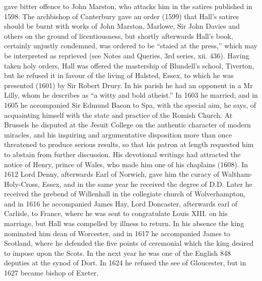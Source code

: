 gave bitter offence to John Marston, who attacks him in the satires published in 1598. The archbishop of Canterbury gave an order (1599) that Hall's satires should be burnt with works of John Marston, Marlowe, Sir John Davies and others on the ground of licentiousness, but shortly afterwards Hall's book, certainly unjustly condemned, was ordered to be ``staied at the press,'' which may be interpreted as reprieved (see Notes and Queries, 3rd series, xii. 436). Having taken holy orders, Hall was offered the mastership of Blundell's school, Tiverton, but he refused it in favour of the living of Halsted, Essex, to which he was presented (1601) by Sir Robert Drury. In his parish he had an opponent in a Mr Lilly, whom he describes as ``a witty and bold atheist.'' In 1603 he married; and in 1605 he accompanied Sir Edmund Bacon to Spa, with the special aim, he says, of acquainting himself with the state and practice of the Romish Church. At Brussels he disputed at the Jesuit College on the authentic character of modern miracles, and his inquiring and argumentative disposition more than once threatened to produce serious results, so that his patron at length requested him to abstain from further discussion. His devotional writings had attracted the notice of Henry, prince of Wales, who made him one of his chaplains (1608). In 1612 Lord Denny, afterwards Earl of Norwich, gave him the curacy of Waltham-Holy-Cross, Essex, and in the same year he received the degree of D.D. Later he received the prebend of Willenhall in the collegiate church of Wolverhampton, and in 1616 he accompanied James Hay, Lord Doncaster, afterwards earl of Carlisle, to France, where he was sent to congratulate Louis XIII. on his marriage, but Hall was compelled by illness to return. In his absence the king nominated him dean of Worcester, and in 1617 he accompanied James to Scotland, where he defended the five points of ceremonial which the king desired to impose upon the Scots. In the next year he was one of the English 848 deputies at the synod of Dort. In 1624 he refused the see of Gloucester, but in 1627 became bishop of Exeter.

